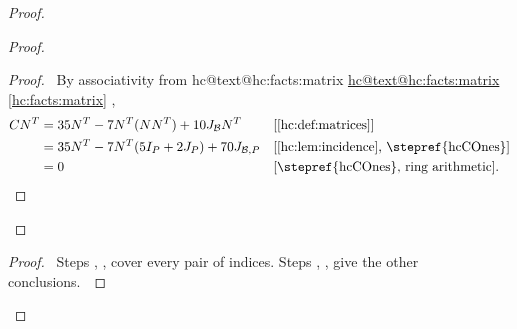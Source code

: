 \documentclass[11pt]{amsart}
\makeatletter
\let\qed\relax
\newcommand\cB{{\mathcal B}}
\let\hcSavedRef\ref
\renewcommand{\ref}[1]{%
  \ifcsname hc@text@#1\endcsname
    \hyperlink{\csname hc@target@#1\endcsname}{\csname hc@text@#1\endcsname}%
  \else
    \hcSavedRef{#1}%
  \fi}}
\makeatother
\begin{document}
\begin{proof}
\begin{proof}
  \qedstep
  \begin{proof}
   \pf\ By associativity from \ref{hc:facts:matrix},
   \begin{align*}
    CN^T&=35N^T-7N^T(NN^T)+10J_{\cB}N^T
      &&\text{[\ref{hc:def:matrices}]}\\
    &=35N^T-7N^T(5I_P+2J_P)+70J_{\cB,P}
      &&\text{[\ref{hc:lem:incidence}, \stepref{hcCOnes}]}\\
    &=0 &&\text{[\stepref{hcCOnes}, ring arithmetic].}
   \end{align*}\qed
  \end{proof}
 \end{proof}
 \qedstep
 \begin{proof}\pf\ Steps , ,
   cover every pair of indices.
  Steps , , 
  give the other conclusions.~\qed\end{proof}
\end{proof}
\end{document}
